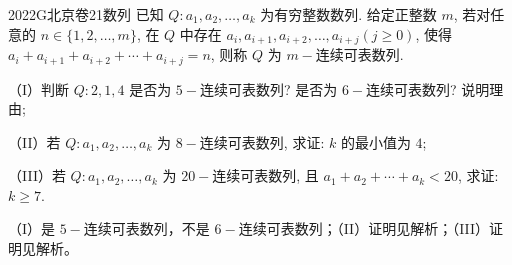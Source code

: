 
\begin{problem}{2022}{G}{北京卷}{21}{数列}
已知 $Q: a_1, a_2, \dots, a_k$ 为有穷整数数列. 给定正整数 $m$, 若对任意的 $n \in \{1, 2, \dots, m\}$, 在 $Q$ 中存在 $a_i, a_{i+1}, a_{i+2}, \dots, a_{i+j} (j \geqslant 0)$, 使得 $a_i + a_{i+1} + a_{i+2} + \cdots + a_{i+j} = n$, 则称 $Q$ 为 $m-$连续可表数列.

（I）判断 $Q: 2, 1, 4$ 是否为 $5-$连续可表数列? 是否为 $6-$连续可表数列? 说明理由;

（II）若 $Q: a_1, a_2, \dots, a_k$ 为 $8-$连续可表数列, 求证: $k$ 的最小值为 $4$;

（III）若 $Q: a_1, a_2, \dots, a_k$ 为 $20-$连续可表数列, 且 $a_1 + a_2 + \cdots + a_k < 20$, 求证: $k \geqslant 7$.
\end{problem}

\begin{answer}
（I）是 $5-$连续可表数列，不是 $6-$连续可表数列；（II）证明见解析；（III）证明见解析。
\end{answer}

